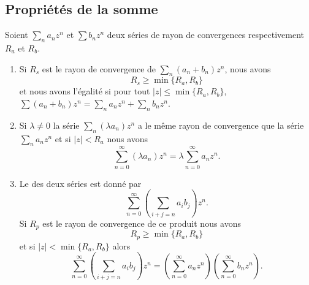 \subsection{Propriétés de la somme}

\begin{theorem}     \label{ThokPTXYC}
    Soient \( \sum_na_nz^n\) et \( \sum b_nz^n\) deux séries de rayon de convergences respectivement \( R_a\) et \( R_b\).
    \begin{enumerate}
        \item   \label{IteWlajij}
            Si \( R_s\) est le rayon de convergence de \( \sum_n(a_n+b_n)z^n\), nous avons
            \begin{equation}
                R_s\geq \min\{ R_a,R_b \}
            \end{equation}
            et nous avons l'égalité si pour tout \( |z |\leq\min\{ R_a,R_b \}\), \( \sum (a_n+b_n)z^n=\sum_n a_nz^n+\sum_nb_nz^n\).
        \item
            Si \( \lambda\neq 0\) la série \( \sum_n(\lambda a_n)z^n\) a le même rayon de convergence que la série \( \sum_na_nz^n\) et si \( | z |<R_a\) nous avons
            \begin{equation}
                \sum_{n=0}^{\infty}(\lambda a_n)z^n=\lambda\sum_{n=0}^{\infty}a_nz^n.
            \end{equation}
        \item
            Le  des deux séries est donné par
            \begin{equation}
                \sum_{n=0}^{\infty}\left( \sum_{i+j=n}a_ib_j \right)z^n.
            \end{equation}
            Si \( R_p\) est le rayon de convergence de ce produit nous avons
            \begin{equation}
                R_p\geq \min\{ R_a,R_b \}
            \end{equation}
            et si \( | z |<\min\{ R_a,R_b \}\) alors
            \begin{equation}
                \sum_{n=0}^{\infty}\left( \sum_{i+j=n}a_ib_j \right)z^n=\left( \sum_{n=0}^{\infty}a_nz^n \right)\left( \sum_{n=0}^{\infty}b_nz^n \right).
            \end{equation}
            
    \end{enumerate}
    
\end{theorem}

